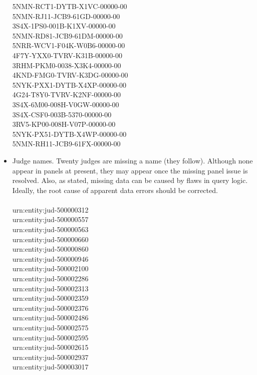 \documentclass[10pt, letterpaper]{article}
\begin{document}
\begin{spacing}{1.0}
\begin{itemize}
    5NMN-RCT1-DYTB-X1VC-00000-00\\
    5NMN-RJ11-JCB9-61GD-00000-00\\
    3S4X-1PS0-001B-K1XV-00000-00\\
    5NMN-RD81-JCB9-61DM-00000-00\\
    5NRR-WCV1-F04K-W0B6-00000-00\\
    4F7Y-YXX0-TVRV-K31B-00000-00\\
    3RHM-PKM0-0038-X3K4-00000-00\\
    4KND-FMG0-TVRV-K3DG-00000-00\\
    5NYK-PXX1-DYTB-X4XP-00000-00\\
    4G24-T8Y0-TVRV-K2NF-00000-00\\
    3S4X-6M00-008H-V0GW-00000-00\\
    3S4X-CSF0-003B-5370-00000-00\\
    3RV5-KP00-008H-V07P-00000-00\\
    5NYK-PX51-DYTB-X4WP-00000-00\\
    5NMN-RH11-JCB9-61FX-00000-00\\
    
    \item Judge names.  Twenty judges are missing a name (they follow).  Although none appear in panels at present, they may appear once the missing panel issue is resolved.  Also, as stated, missing data can be caused by flaws in query logic.  Ideally, the root cause of apparent data errors should be corrected.\\\\
    urn:entity:jud-500000312\\
    urn:entity:jud-500000557\\
    urn:entity:jud-500000563\\
    urn:entity:jud-500000660\\
    urn:entity:jud-500000860\\
    urn:entity:jud-500000946\\
    urn:entity:jud-500002100\\
    urn:entity:jud-500002286\\
    urn:entity:jud-500002313\\
    urn:entity:jud-500002359\\
    urn:entity:jud-500002376\\
    urn:entity:jud-500002486\\
    urn:entity:jud-500002575\\
    urn:entity:jud-500002595\\
    urn:entity:jud-500002615\\
    urn:entity:jud-500002937\\
    urn:entity:jud-500003017\\
    

\end{itemize}
\end{spacing}
\end{document}
